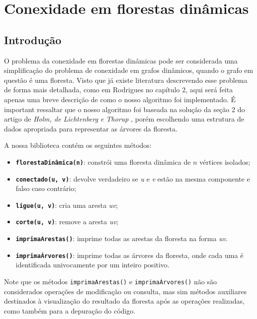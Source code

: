 
\chapter{Conexidade em florestas dinâmicas}

\section{Introdução}

O problema da conexidade em florestas dinâmicas pode ser considerada uma simplificação do problema de conexidade em grafos dinâmicos, quando o grafo em questão é uma floresta. Visto que já existe literatura descrevendo esse problema de forma mais detalhada, como em Rodrigues \cite{arthur} no capítulo 2, aqui será feita apenas uma breve descrição de como o nosso algoritmo foi implementado. É important ressaltar que o nosso algoritmo foi baseada na solução da seção 2 do artigo de \textit{Holm, de Lichtenberg e Thorup} \cite{jacob_holm}, porém escolhendo uma estrutura de dados apropriada para representar as árvores da floresta.

A nossa biblioteca contém os seguintes métodos:

\begin{itemize}
    \item \texttt{\textbf{florestaDinâmica(n)}}: constrói uma floresta dinâmica de $n$ vértices isolados;
    \item \texttt{\textbf{conectado(u, v)}}: devolve verdadeiro se \textit{u} e \textit{v} estão na mesma componente e falso caso contrário;
    \item \texttt{\textbf{ligue(u, v)}}: cria uma aresta \textit{uv};
    \item \texttt{\textbf{corte(u, v)}}: remove a aresta \textit{uv};
    \item \texttt{\textbf{imprimaArestas()}}: imprime todas as arestas da floresta na forma \textit{uv}.
    \item \texttt{\textbf{imprimaÁrvores()}}: imprime todas as árvores da floresta, onde cada uma é identificada univocamente por um inteiro positivo.
\end{itemize}

Note que os métodos \texttt{imprimaArestas()} e \texttt{imprimaÁrvores()} não são considerados operações de modificação ou consulta, mas sim métodos auxiliares destinados à visualização do resultado da floresta após as operações realizadas, como também para a depuração do código.  

